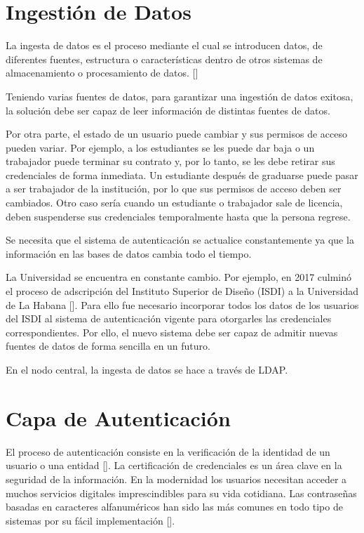 \section{Ingestión de Datos} \label{data-layer}
La ingesta de datos es el proceso mediante el cual se introducen datos, de diferentes fuentes,
estructura o características dentro de otros sistemas de almacenamiento o procesamiento de
datos.  [\cite{fernandez2020aplicacion}]

Teniendo varias fuentes de datos, para garantizar una ingestión de datos exitosa, la solución debe ser capaz de leer información de distintas fuentes de datos. 

Por otra parte, el estado de un usuario puede cambiar y sus permisos de acceso pueden variar. Por ejemplo, a los estudiantes se les puede dar baja o un trabajador puede terminar su contrato y, por lo tanto, se les debe retirar sus credenciales de forma inmediata. Un estudiante después de graduarse puede pasar a ser trabajador de la institución, por lo que sus permisos de acceso deben ser cambiados. Otro caso sería cuando un estudiante o trabajador sale de licencia, deben suspenderse sus credenciales temporalmente hasta que la persona regrese. 

Se necesita que el sistema de autenticación se actualice constantemente ya que la información en las bases de datos cambia todo el tiempo.

La Universidad  se encuentra en constante cambio. Por ejemplo, en 2017 culminó el proceso de adscripción del Instituto Superior de Diseño (ISDI) a la Universidad de La Habana [\cite{isdi-historia}]. Para ello fue necesario incorporar todos los datos de los usuarios del ISDI al sistema de autenticación vigente para otorgarles las credenciales correspondientes. Por ello, el nuevo sistema debe ser capaz de admitir nuevas fuentes de datos de forma sencilla en un futuro. 

En el nodo central, la ingesta de datos se hace a través de LDAP.


\section{Capa de Autenticación} \label{auth-layer}
El proceso de autenticación consiste en la verificación de la identidad de un usuario o una entidad  [\cite{teheran2014mecanismo}]. La certificación de credenciales es un área clave en la seguridad de la información. En la modernidad los usuarios necesitan acceder a muchos servicios digitales imprescindibles para su vida cotidiana. Las contraseñas basadas en caracteres alfanuméricos han sido las más comunes en todo tipo de sistemas por su fácil implementación [\cite{rodriguez2018seguridad}].

